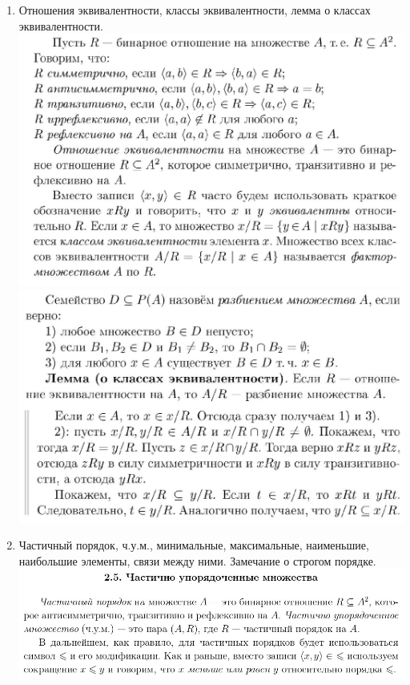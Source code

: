 \documentclass[a4paper]{article}
\theoremstyle{definition}
\begin{document}
\begin{enumerate}
\begin{proof}
       \end{proof}
 \item Отношения эквивалентности, классы эквивалентности, лемма о классах эквивалентности.
       \mbox{}\\ \includegraphics[scale=0.45]{7_1.jpg}\\
       \includegraphics[scale=0.45]{7_2.jpg}
 \item Частичный порядок, ч.у.м., минимальные, максимальные, наименьшие, наибольшие элементы, связи между ними. Замечание о строгом порядке.
       \mbox{}\\\includegraphics[scale=0.45]{8_1.jpg}\\

\end{enumerate}
\end{document}
